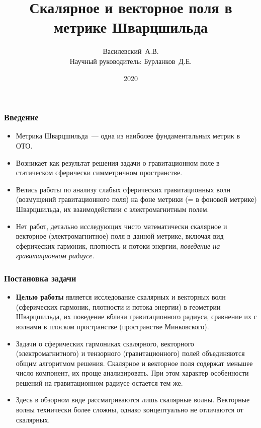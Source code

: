 \documentclass[compress, 9pt]{beamer}
\title{Скалярное и векторное поля в метрике Шварцшильда}
\author[Василевский~А.В.]{
    Василевский~А.В. \\[\baselineskip]
    {\footnotesize Научный руководитель: Бурланков~Д.Е.}
}
\institute[ННГУ]{Нижегородский университет им. Н.И.~Лобачевского}
\date{2020}
\begin{document}
    \frame[plain]{\titlepage}

    \begin{frame}\frametitle{Введение}

        \begin{itemize}\justifying
            \item Метрика Шварцшильда~--- одна из наиболее фундаментальных метрик в ОТО.
            \item Возникает как результат решения задачи о гравитационном поле в статическом сферически симметричном пространстве.
            \item Велись работы по анализу слабых сферических гравитационных волн (возмущений гравитационного поля) на фоне метрики (= в фоновой метрике) Шварцшильда\nocite{regge_wheeler_1957,Vas2019b}, их взаимодействии с электромагнитным полем.
            \item Нет работ, детально исследующих чисто математически скалярное и векторное (электромагнитное) поля в данной метрике, включая вид сферических гармоник, плотность и потоки энергии, \textit{поведение на гравитационном радиусе}.
        \end{itemize}

    \end{frame}

    \begin{frame}\frametitle{Постановка задачи}

        \begin{itemize}\justifying
            \item \textbf{Целью работы} является исследование скалярных и векторных волн (сферических гармоник, плотности и потока энергии) в геометрии Шварцшильда, их поведение вблизи гравитационного радиуса, сравнение их с волнами в плоском пространстве (пространстве Минковского).

            \item Задачи о сферических гармониках скалярного, векторного (электромагнитного) и тензорного (гравитационного) полей объединяются общим алгоритмом решения. Скалярное и векторное поля содержат меньшее число компонент, их проще анализировать. При этом характер особенности решений на гравитационном радиусе остается тем же.

            \item Здесь в обзорном виде рассматриваются лишь скалярные волны. Векторные волны технически более сложны, однако концептуально не отличаются от скалярных.
        \end{itemize}

    \end{frame}
\end{document}
